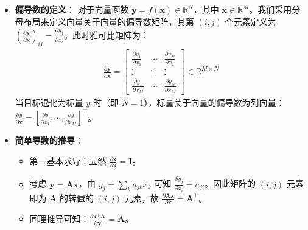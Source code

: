 \documentclass{article}
\theoremstyle{remark}
\theoremstyle{definition}
\theoremstyle{plain}
\numberwithin {equation}{section}
\numberwithin{assumption}{section}
\begin{document}
\begin{enumerate}
\begin{itemize}
\begin{itemize}
            \item \textbf{偏导数的定义}：
            对于向量函数 $\boldsymbol{y}=f(\boldsymbol{x}) \in \mathbb{R}^N$，其中 $\boldsymbol{x} \in \mathbb{R}^M$。我们采用分母布局来定义向量关于向量的偏导数矩阵，其第 $(i, j)$ 个元素定义为 $\left(\frac{\partial \boldsymbol{y}}{\partial \boldsymbol{x}}\right)_{ij} = \frac{\partial y_j}{\partial x_i}$。此时雅可比矩阵为：
            \begin{align*}
            \frac{\partial \boldsymbol{y}}{\partial \boldsymbol{x}} = \left[\begin{array}{ccc}
            \frac{\partial y_1}{\partial x_1} & \cdots & \frac{\partial y_N}{\partial x_1} \\
            \vdots & \ddots & \vdots \\
            \frac{\partial y_1}{\partial x_M} & \cdots & \frac{\partial y_N}{\partial x_M}
            \end{array}\right] \in \mathbb{R}^{M \times N}
            \end{align*}
            当目标退化为标量 $y$ 时（即 $N=1$），标量关于向量的偏导数为列向量：$\frac{\partial y}{\partial \boldsymbol{x}}=\left[\frac{\partial y}{\partial x_1}, \cdots, \frac{\partial y}{\partial x_M}\right]^{\top}$。

            \item \textbf{简单导数的推导}：
            \begin{itemize}
                \item 第一基本求导：显然 $\frac{\partial \boldsymbol{x}}{\partial \boldsymbol{x}}=\boldsymbol{I}$。
                \item 考虑 $\boldsymbol{y} = \boldsymbol{A}\boldsymbol{x}$，由 $y_j = \sum_{k} a_{jk} x_k$ 可知 $\frac{\partial y_j}{\partial x_i} = a_{ji}$。因此矩阵的 $(i, j)$ 元素即为 $\boldsymbol{A}$ 的转置的 $(i, j)$ 元素，故 $\frac{\partial \boldsymbol{A} \boldsymbol{x}}{\partial \boldsymbol{x}}=\boldsymbol{A}^{\top}$。
                \item 同理推导可知：$\frac{\partial \boldsymbol{x}^{\top} \boldsymbol{A}}{\partial \boldsymbol{x}}=\boldsymbol{A}$。
            \end{itemize}


\end{itemize}
\end{itemize}
\end{enumerate}
\end{document}
